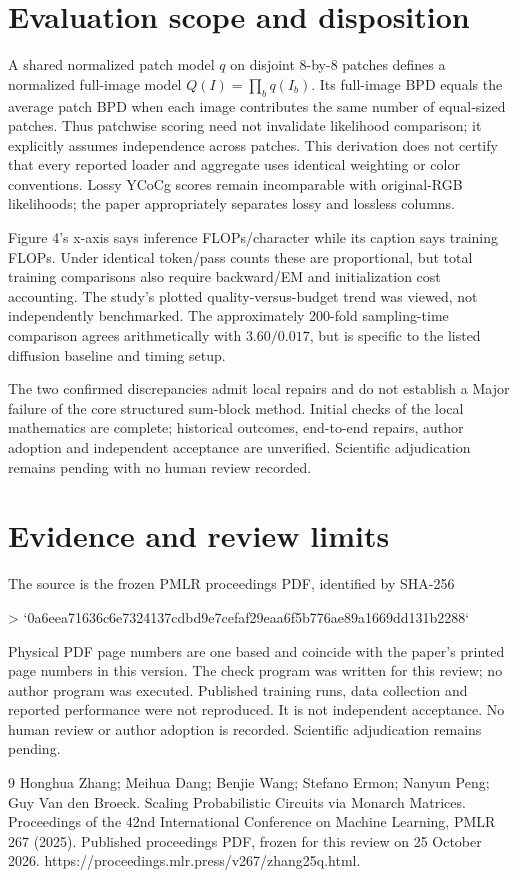 \documentclass[10pt]{article}
\begin{document}
\section*{Evaluation scope and disposition}
A shared normalized patch model \(q\) on disjoint 8-by-8 patches defines a normalized full-image model \(Q(I)=\prod_bq(I_b)\). Its full-image BPD equals the average patch BPD when each image contributes the same number of equal-sized patches. Thus patchwise scoring need not invalidate likelihood comparison; it explicitly assumes independence across patches. This derivation does not certify that every reported loader and aggregate uses identical weighting or color conventions. Lossy YCoCg scores remain incomparable with original-RGB likelihoods; the paper appropriately separates lossy and lossless columns.\par
Figure 4’s x-axis says inference FLOPs/character while its caption says training FLOPs. Under identical token/pass counts these are proportional, but total training comparisons also require backward/EM and initialization cost accounting. The study’s plotted quality-versus-budget trend was viewed, not independently benchmarked. The approximately 200-fold sampling-time comparison agrees arithmetically with \(3.60/0.017\), but is specific to the listed diffusion baseline and timing setup.\par
The two confirmed discrepancies admit local repairs and do not establish a Major failure of the core structured sum-block method. Initial checks of the local mathematics are complete; historical outcomes, end-to-end repairs, author adoption and independent acceptance are unverified. Scientific adjudication remains pending with no human review recorded.\par
\section*{Evidence and review limits}
The source is the frozen PMLR proceedings PDF, identified by SHA-256\par
> `0a6eea71636c6e7324137cdbd9e7cefaf29eaa6f5b776ae89a1669dd131b2288`\par
Physical PDF page numbers are one based and coincide with the paper’s printed page numbers in this version. The check program was written for this review; no author program was executed. Published training runs, data collection and reported performance were not reproduced. It is not independent acceptance. No human review or author adoption is recorded. Scientific adjudication remains pending.\par
9 Honghua Zhang; Meihua Dang; Benjie Wang; Stefano Ermon; Nanyun Peng; Guy Van den Broeck. Scaling Probabilistic Circuits via Monarch Matrices. Proceedings of the 42nd International Conference on Machine Learning, PMLR 267 (2025). Published proceedings PDF, frozen for this review on 25 October 2026. https://proceedings.mlr.press/v267/zhang25q.html.\par
\end{document}
